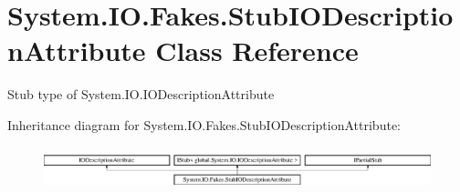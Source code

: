 \hypertarget{class_system_1_1_i_o_1_1_fakes_1_1_stub_i_o_description_attribute}{\section{System.\-I\-O.\-Fakes.\-Stub\-I\-O\-Description\-Attribute Class Reference}
\label{class_system_1_1_i_o_1_1_fakes_1_1_stub_i_o_description_attribute}
}


Stub type of System.\-I\-O.\-I\-O\-Description\-Attribute 


Inheritance diagram for System.\-I\-O.\-Fakes.\-Stub\-I\-O\-Description\-Attribute\-:\begin{figure}[H]
\begin{center}
\leavevmode
\includegraphics[height=1.265537cm]{class_system_1_1_i_o_1_1_fakes_1_1_stub_i_o_description_attribute}
\end{center}
\end{figure}
